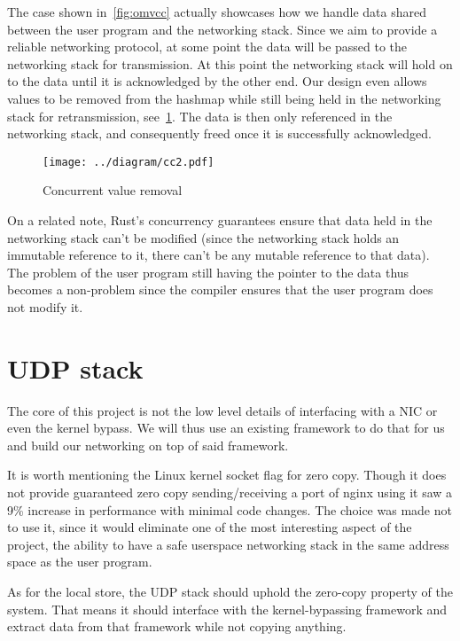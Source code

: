 \documentclass[11pt]{book}
\begin{document}
The case shown in~\ref{fig:omvcc} actually showcases how we handle
data shared between the user program and the networking stack. Since
we aim to provide a reliable networking protocol, at some point the
data will be passed to the networking stack for transmission. At this
point the networking stack will hold on to the data until it is
acknowledged by the other end. Our design even allows values to be
removed from the hashmap while still being held in the networking
stack for retransmission, see~\ref{fig:cc2}. The data is then only
referenced in the networking stack, and consequently freed once it is
successfully acknowledged.

\begin{figure}[htb!]
  \texttt{[image: ../diagram/cc2.pdf]}
  \caption{Concurrent value removal}
  \label{fig:cc2}
\end{figure}

On a related note, Rust's concurrency guarantees ensure that data held
in the networking stack can't be modified (since the networking stack
holds an immutable reference to it, there can't be any mutable
reference to that data). The problem of the user program still having
the pointer to the data thus becomes a non-problem since the compiler
ensures that the user program does not modify it.

\section{UDP stack} \label{sec:udp-design}

The core of this project is not the low level details of interfacing
with a NIC or even the kernel bypass. We will thus use an existing
framework to do that for us and build our networking on top of said
framework.

It is worth mentioning the Linux kernel socket flag for zero copy.
Though it does not provide guaranteed zero copy sending/receiving a
port of nginx using it saw a 9\% increase in performance with minimal
code changes. The choice was made not to use it, since it would
eliminate one of the most interesting aspect of the project, the
ability to have a safe userspace networking stack in the same address
space as the user program.

As for the local store, the UDP stack should uphold the zero-copy
property of the system. That means it should interface with the
kernel-bypassing framework and extract data from that framework while
not copying anything.
\end{document}
